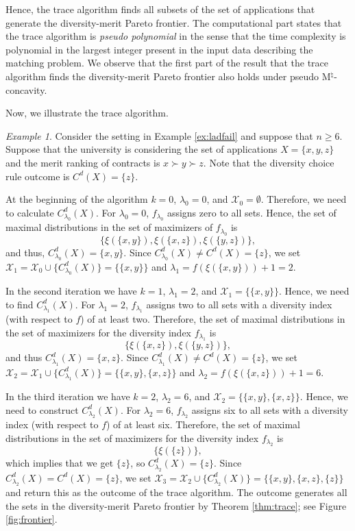 \documentclass[12pt]{amsart}
\theoremstyle{remark}
\newtheorem{example}{Example}
\begin{document}
Hence, the trace algorithm finds all subsets of the set of applications
that generate the diversity-merit Pareto frontier. The computational part states that the trace algorithm is {\it pseudo polynomial} in the sense that the time complexity is polynomial in the largest integer present in the input data describing the matching problem.
We observe that the first part of the result that the trace algorithm finds the diversity-merit Pareto frontier also holds under pseudo M$^\natural$-concavity.

Now, we illustrate the trace algorithm.

\begin{example}\label{ex:frontier}
Consider the setting in Example \ref{ex:ladfail} and suppose that $n\geq 6$.
Suppose that the university is considering
the set of applications $X=\{x,y,z\}$ and the merit ranking of contracts is
$x\succ y \succ z$. Note that the diversity choice rule outcome is
$C^d(X)=\{z\}$.

At the beginning of the algorithm $k=0$,
$\lambda_0=0$, and $\mathcal{X}_0=\emptyset$.
Therefore, we need to calculate $C^d_{\lambda_0}(X)$. For $\lambda_0=0$, $f_{\lambda_0}$ assigns zero to all sets.
Hence, the set of maximal distributions in the
set of maximizers of $f_{\lambda_0}$ is
\[ \{ \xi(\{x,y\}), \xi(\{x,z\}), \xi(\{y,z\})\},\]
and thus, $C^d_{\lambda_0}(X)=\{x,y\}$. Since $C^d_{\lambda_0}(X)\neq C^d(X)=\{z\}$, we set
$\mathcal{X}_1=\mathcal{X}_0 \cup \{C^d_{\lambda_0}(X)\}=\{\{x,y\}\}$ and $\lambda_1=f(\xi(\{x,y\}))+1=2$.

In the second iteration we have $k=1$, $\lambda_1=2$, and $\mathcal{X}_1=\{\{x,y\}\}$.
Hence, we need to find $C^d_{\lambda_1}(X)$. For $\lambda_1=2$, $f_{\lambda_1}$ assigns two to
all sets with a diversity index (with respect to $f$) of at least two. Therefore, the set of maximal
distributions in the set of maximizers for the diversity index $f_{\lambda_1}$ is
\[ \{ \xi(\{x,z\}), \xi(\{y,z\})\},\]
and thus $C^d_{\lambda_1}(X)=\{x,z\}$. Since $C^d_{\lambda_1}(X)\neq C^d(X)=\{z\}$, we set
$\mathcal{X}_2=\mathcal{X}_1 \cup \{C^d_{\lambda_1}(X)\}=\{\{x,y\},\{x,z\}\}$ and $\lambda_2=f(\xi(\{x,z\}))+1=6$.

In the third iteration we have $k=2$, $\lambda_2=6$, and $\mathcal{X}_2=\{\{x,y\},\{x,z\}\}$.
Hence, we need to construct $C^d_{\lambda_2}(X)$. For $\lambda_2=6$, $f_{\lambda_2}$
assigns six to all sets with a diversity index (with respect to $f$) of at least
six. Therefore, the set of maximal distributions in the set of maximizers for the
diversity index $f_{\lambda_2}$ is
\[ \{ \xi(\{z\})\},\]
which implies that we get $\{z\}$, so
$C^d_{\lambda_2}(X)=\{z\}$. Since $C^d_{\lambda_2}(X)=C^d(X)=\{z\}$, we set
$\mathcal{X}_3=\mathcal{X}_2 \cup \{C^d_{\lambda_2}(X)\}=\{\{x,y\},\{x,z\},\{z\}\}$ and return this as the outcome of the trace algorithm.
The outcome generates all the sets in the diversity-merit Pareto
frontier by Theorem \ref{thm:trace}; see Figure \ref{fig:frontier}.


\end{example}
\end{document}
